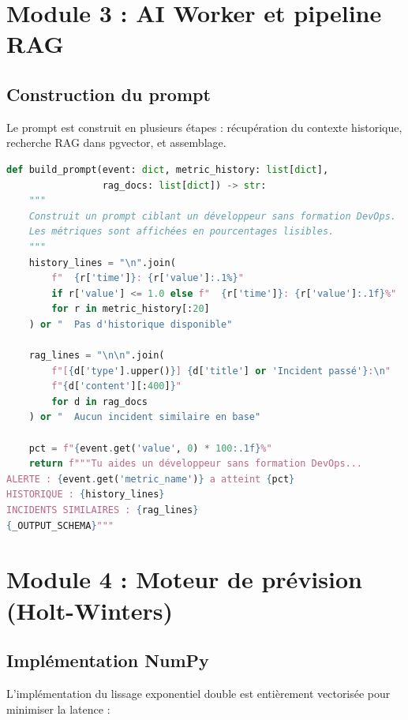 \section{Module 3 : AI Worker et pipeline RAG}

\subsection{Construction du prompt}

Le prompt est construit en plusieurs étapes : récupération du contexte historique,
recherche RAG dans pgvector, et assemblage.

\begin{lstlisting}[language=Python, caption={Extrait de \texttt{prompt\_builder.py}}]
def build_prompt(event: dict, metric_history: list[dict],
                 rag_docs: list[dict]) -> str:
    """
    Construit un prompt ciblant un développeur sans formation DevOps.
    Les métriques sont affichées en pourcentages lisibles.
    """
    history_lines = "\n".join(
        f"  {r['time']}: {r['value']:.1%}"
        if r['value'] <= 1.0 else f"  {r['time']}: {r['value']:.1f}%"
        for r in metric_history[:20]
    ) or "  Pas d'historique disponible"

    rag_lines = "\n\n".join(
        f"[{d['type'].upper()}] {d['title'] or 'Incident passé'}:\n"
        f"{d['content'][:400]}"
        for d in rag_docs
    ) or "  Aucun incident similaire en base"

    pct = f"{event.get('value', 0) * 100:.1f}%"
    return f"""Tu aides un développeur sans formation DevOps...
ALERTE : {event.get('metric_name')} a atteint {pct}
HISTORIQUE : {history_lines}
INCIDENTS SIMILAIRES : {rag_lines}
{_OUTPUT_SCHEMA}"""
\end{lstlisting}

\section{Module 4 : Moteur de prévision (Holt-Winters)}

\subsection{Implémentation NumPy}

L'implémentation du lissage exponentiel double est entièrement vectorisée
pour minimiser la latence :

